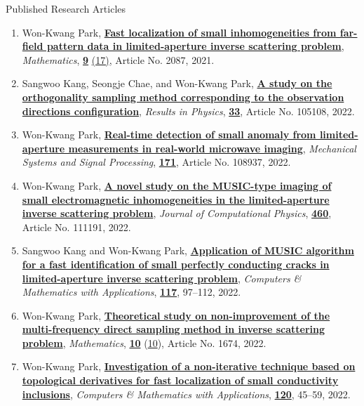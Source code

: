 \documentclass{resume} %
\begin{document}
\begin{rSection}{Published Research Articles}
\begin{enumerate}
\item\label{A-MATH2021B} Won-Kwang Park, \href{https://doi.org/10.3390/math9172087}{\textbf{Fast localization of small inhomogeneities from far-field pattern data in limited-aperture inverse scattering problem}}, \textit{Mathematics}, \href{https://www.mdpi.com/2227-7390/9}{\textbf{9}} \href{https://www.mdpi.com/2227-7390/9/17}{(17)}, Article No. 2087, 2021.
\item\label{A-RINP2022} Sangwoo Kang, Seongje Chae, and Won-Kwang Park, \href{https://doi.org/10.1016/j.rinp.2021.105108}{\textbf{A study on the orthogonality sampling method corresponding to the observation directions configuration}}, \textit{Results in Physics}, \href{https://www.sciencedirect.com/science/journal/22113797/33/supp/C}{\textbf{33}}, Article No. 105108, 2022.
\item\label{A-MSSP2022} Won-Kwang Park, \href{https://doi.org/10.1016/j.ymssp.2022.108937}{\textbf{Real-time detection of small anomaly from limited-aperture measurements in real-world microwave imaging}}, \textit{Mechanical Systems and Signal Processing}, \href{https://www.sciencedirect.com/journal/mechanical-systems-and-signal-processing/vol/171/suppl/C}{\textbf{171}}, Article No. 108937, 2022.
\item\label{A-JCOMP2022A} Won-Kwang Park, \href{https://doi.org/10.1016/j.jcp.2022.111191}{\textbf{A novel study on the MUSIC-type imaging of small electromagnetic inhomogeneities in the limited-aperture inverse scattering problem}}, \textit{Journal of Computational Physics}, \href{https://www.sciencedirect.com/journal/journal-of-computational-physics/vol/460/suppl/C}{\textbf{460}}, Article No. 111191, 2022.
\item\label{A-CAMWA2022A} Sangwoo Kang and Won-Kwang Park, \href{https://doi.org/10.1016/j.camwa.2022.04.015}{\textbf{Application of MUSIC algorithm for a fast identification of small perfectly conducting cracks in limited-aperture inverse scattering problem}}, \textit{Computers \& Mathematics with Applications}, \href{https://www.sciencedirect.com/journal/computers-and-mathematics-with-applications/vol/117/suppl/C}{\textbf{117}}, 97--112, 2022.
\item\label{A-MATH2022} Won-Kwang Park, \href{https://doi.org/10.3390/math10101674}{\textbf{Theoretical study on non-improvement of the multi-frequency direct sampling method in inverse scattering problem}}, \textit{Mathematics}, \href{https://www.mdpi.com/2227-7390/10}{\textbf{10}} (\href{https://www.mdpi.com/2227-7390/10/10}{10}), Article No. 1674, 2022.
\item\label{A-CAMWA2022B} Won-Kwang Park, \href{https://doi.org/10.1016/j.camwa.2022.06.022}{\textbf{Investigation of a non-iterative technique based on topological derivatives for fast localization of small conductivity inclusions}}, \textit{Computers \& Mathematics with Applications}, \href{https://www.sciencedirect.com/journal/computers-and-mathematics-with-applications/vol/120/suppl/C}{\textbf{120}}, 45--59, 2022.

\end{enumerate}
\end{rSection}
\end{document}
